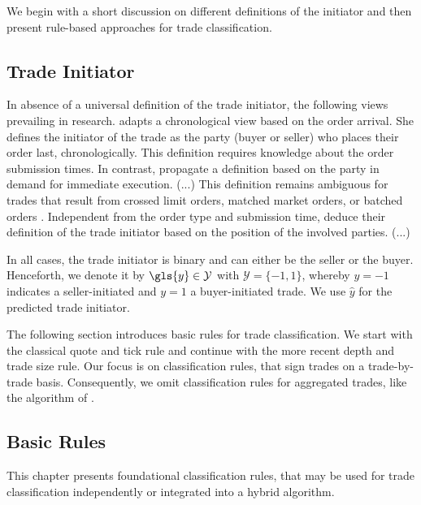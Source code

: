 We begin with a short discussion on different definitions of the initiator and then present rule-based approaches for trade classification.

\subsection{Trade Initiator}
\label{sec:trade-initiator}

In absence of a universal definition of the trade initiator, the following views prevailing in research. \textcite[][267]{odders-whiteOccurrenceConsequencesInaccurate2000} adapts a chronological view based on the order arrival. She defines the initiator of the trade as the party (buyer or seller) who places their order last, chronologically. This definition requires knowledge about the order submission times. In contrast, \textcite[][94--97]{leeInferringInvestorBehavior2000} propagate a definition based on the party in demand for immediate execution. (...) This definition remains ambiguous for trades that result from crossed limit orders, matched market orders, or batched orders \autocite[][94--95]{leeInferringInvestorBehavior2000}. Independent from the order type and submission time, \textcite[][533]{ellisAccuracyTradeClassification2000} deduce their definition of the trade initiator based on the position of the involved parties. (...)

In all cases, the trade initiator is binary and can either be the seller or the buyer. Henceforth, we denote it by $\gls{y} \in \mathcal{Y}$ with $\mathcal{Y}=\{-1,1\}$, whereby $y=-1$ indicates a seller-initiated and $y=1$ a buyer-initiated trade. We use $\hat{y}$ for the predicted trade initiator.

The following section introduces basic rules for trade classification. We start with the classical quote and tick rule and continue with the more recent depth and trade size rule. Our focus is on classification rules, that sign trades on a trade-by-trade basis. Consequently, we omit classification rules for aggregated trades, like the  algorithm of \textcite[][1466--1468]{easleyFlowToxicityLiquidity2012}.

\subsection{Basic Rules}\label{sec:basic-rules}

This chapter presents foundational classification rules, that may be used for trade classification independently or integrated into a hybrid algorithm.

